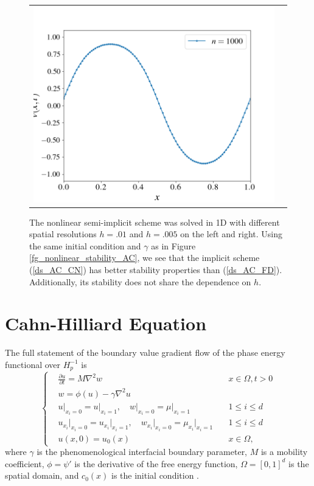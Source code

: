 \documentclass[12pt, reqno]{report}
\theoremstyle{definition}
\theoremstyle{remark}
\begin{document}
\begin{figure}[H]
\begin{tabular}{cc}
        \includegraphics[width = \acfdwidth]{media_paper/stable_AC_CN_1000}
    \end{tabular}

    \caption{The nonlinear semi-implicit scheme was solved in 1D with different spatial resolutions $h=.01$ and $h=.005$ on the left and right. 
    Using the same initial condition and $\gamma$ as in Figure \ref{fg_nonlinear_stability_AC}, we see that the implicit scheme (\ref{ds_AC_CN}) has better stability properties than (\ref{ds_AC_FD}). 
    Additionally, its stability does not share the dependence on $h$.}
    \label{fg_nonlinear_stability_implicit_AC}
    
\end{figure}

\section{Cahn-Hilliard Equation} \label{sec_CH}

The full statement of the boundary value gradient flow of the phase energy functional over $H^{-1}_p$ is 
\begin{equation} \label{eq_CH}
    \left\{
        \begin{split}
            &\frac{\partial u}{\partial t}=M\nabla^2w&x\in\Omega,t>0\\
            &w=\phi(u)-\gamma\nabla^2u\\
            &u\big|_{x_i=0}=u\big|_{x_i=1},\quad w\big|_{x_i=0}=\mu\big|_{x_i=1}\quad&1\le i\le d\\
            &u_{x_i}\big|_{x_i=0}=u_{x_i}\big|_{x_i=1},\quad w_{x_i}\big|_{x_i=0}=\mu_{x_i}\big|_{x_i=1}\quad&1\le i\le d\\
            &u(x,0)=u_0(x)&x\in\Omega,
        \end{split}
    \right.
\end{equation}
where $\gamma$ is the phenomenological interfacial boundary parameter, $M$ is a mobility coefficient, $\phi=\psi'$ is the derivative of the free energy function, $\Omega=[0,1]^d$ is the spatial domain, and $c_0(x)$ is the initial condition \cite{copetti_1990_kinetics}. 
\end{document}
